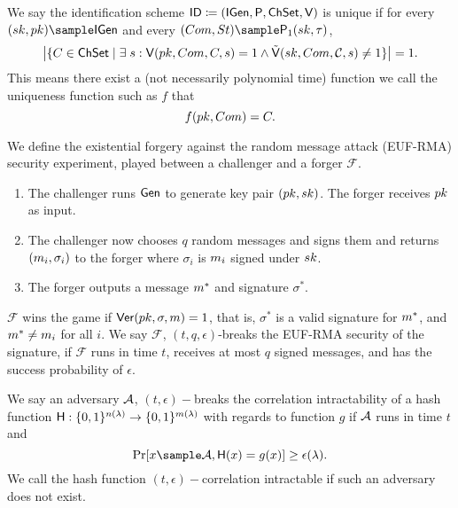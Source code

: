\begin{definition}[$\uniqueness$]
We say the identification scheme $\mathsf{ID} \coloneqq(\mathsf{IGen}, \mathsf{P} ,\mathsf{ChSet}, \mathsf{V})$ is
unique if for every $(\sk,\pk)\sample\IDGen$ and every $(\com,\st)\sample\IDP_1(\sk,\tau)$,
$$\big{|}\{\c \in \ChSet \mid \exists \s : \IDV(\pk,\com,\c,\s) = 1 \land \IDAltV(\sk, \com, \C,  \s) \neq 1 \}\big{|} = 1.$$
This means there exist a (not necessarily polynomial time) function we call the uniqueness function such as $f$ that
$$f(pk,Com) = C.$$
\end{definition}


\begin{definition}
We define the existential forgery against the random message attack (EUF-RMA) security experiment, played between a challenger and a forger $\mathcal{F}$.
\begin{enumerate}
\item The challenger runs $\mathsf{Gen}$ to generate key pair $(pk,sk)$. 
The forger receives $pk$ as input.
\item The challenger now chooses $q$ random messages and signs them and returns $(m_i,\sigma_i)$ to the forger where $\sigma_i$ is $m_i$ signed under $sk$.
\item The forger outputs a message $m^*$ and signature $\sigma^*$.
\end{enumerate}
$\mathcal{F}$ wins the game if $\mathsf{Ver}(pk,\sigma,m) = 1$, that is, $\sigma^*$ is a valid signature for $m^*$, and $m^* \neq m_i$ for all $i$. We say $\mathcal{F}$, $(t,q,\epsilon)$-breaks the EUF-RMA security of the signature, if $\mathcal{F}$ runs in time $t$, receives at most $q$ signed messages, and has the success probability of $\epsilon$. 
\end{definition}


\begin{definition}
We say an adversary $\mathcal{A}$, $(t, \epsilon)-$breaks the correlation intractability of a hash function  $\mathsf{H}: \{0,1\}^{n(\lambda)} \rightarrow \{0,1\}^{m(\lambda)}$ with regards to function $g$ if $\mathcal{A}$ runs in time $t$ and 
$$\Pr[x \sample \adv, \Hash(x) = g(x)] \geq \epsilon(\lambda).$$
We call the hash function $(t, \epsilon)-$correlation intractable if such an adversary does not exist.
\end{definition}







